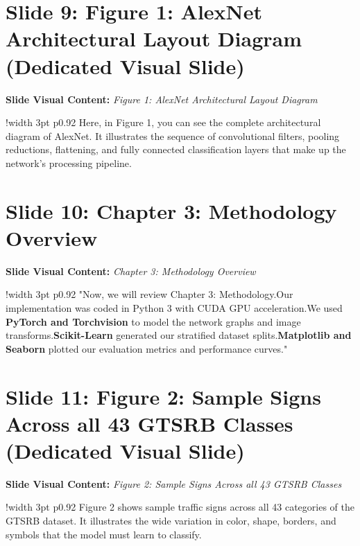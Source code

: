 \documentclass[11pt]{article}
\begin{document}
\section{Slide 9: Figure 1: AlexNet Architectural Layout Diagram (Dedicated Visual Slide)}
\textbf{Slide Visual Content:} \textit{Figure 1: AlexNet Architectural Layout Diagram}\\ [8pt]
\noindent
\begin{tabular}{!{\color{primary}\vrule width 3pt} p{0.92\textwidth}}
  \small\color{black!80} Here, in Figure 1, you can see the complete architectural diagram of AlexNet. It illustrates the sequence of convolutional filters, pooling reductions, flattening, and fully connected classification layers that make up the network's processing pipeline.
\end{tabular}
\vspace{15pt}

\section{Slide 10: Chapter 3: Methodology Overview}
\textbf{Slide Visual Content:} \textit{Chapter 3: Methodology Overview}\\ [8pt]
\noindent
\begin{tabular}{!{\color{primary}\vrule width 3pt} p{0.92\textwidth}}
  \small\color{black!80} "Now, we will review Chapter 3: Methodology.\newline\newline Our implementation was coded in Python 3 with CUDA GPU acceleration.\newline\newline *   We used \textbf{PyTorch and Torchvision} to model the network graphs and image transforms.\newline\newline *   \textbf{Scikit-Learn} generated our stratified dataset splits.\newline\newline *   \textbf{Matplotlib and Seaborn} plotted our evaluation metrics and performance curves."
\end{tabular}
\vspace{15pt}

\section{Slide 11: Figure 2: Sample Signs Across all 43 GTSRB Classes (Dedicated Visual Slide)}
\textbf{Slide Visual Content:} \textit{Figure 2: Sample Signs Across all 43 GTSRB Classes}\\ [8pt]
\noindent
\begin{tabular}{!{\color{primary}\vrule width 3pt} p{0.92\textwidth}}
  \small\color{black!80} Figure 2 shows sample traffic signs across all 43 categories of the GTSRB dataset. It illustrates the wide variation in color, shape, borders, and symbols that the model must learn to classify.
\end{tabular}
\vspace{15pt}
\end{document}
